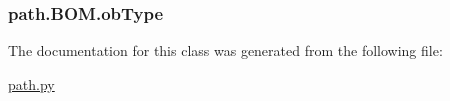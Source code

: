 \subsubsection[{ob\+Type}]{\setlength{\rightskip}{0pt plus 5cm}path.\+B\+O\+M.\+ob\+Type}\label{classpath_1_1_b_o_m_a5748ce4bbb6dfa779752d97f0bee55d2}


The documentation for this class was generated from the following file\+:\begin{DoxyCompactItemize}
\item 
\hyperlink{path_8py}{path.\+py}\end{DoxyCompactItemize}
